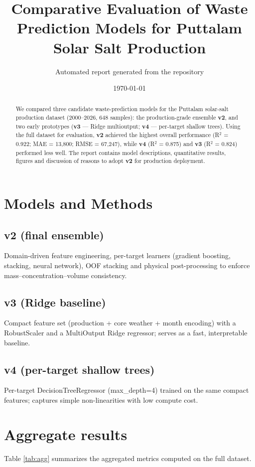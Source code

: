 \documentclass[11pt,a4paper]{article}
\title{Comparative Evaluation of Waste Prediction Models for Puttalam Solar Salt Production}
\author{Automated report generated from the repository}
\date{\today}
\begin{document}
\maketitle

\begin{abstract}
We compared three candidate waste-prediction models for the Puttalam solar-salt production dataset (2000--2026, 648 samples): the production-grade ensemble \textbf{v2}, and two early prototypes (\textbf{v3} — Ridge multioutput; \textbf{v4} — per-target shallow trees). Using the full dataset for evaluation, \textbf{v2} achieved the highest overall performance (R$^2$ = 0.922; MAE = 13,800; RMSE = 67,247), while \textbf{v4} (R$^2$ = 0.875) and \textbf{v3} (R$^2$ = 0.824) performed less well. The report contains model descriptions, quantitative results, figures and discussion of reasons to adopt \textbf{v2} for production deployment.
\end{abstract}

\section{Models and Methods}
\subsection{v2 (final ensemble)}
Domain-driven feature engineering, per-target learners (gradient boosting, stacking, neural network), OOF stacking and physical post-processing to enforce mass--concentration--volume consistency.

\subsection{v3 (Ridge baseline)}
Compact feature set (production + core weather + month encoding) with a RobustScaler and a MultiOutput Ridge regressor; serves as a fast, interpretable baseline.

\subsection{v4 (per-target shallow trees)}
Per-target DecisionTreeRegressor (max\_depth=4) trained on the same compact features; captures simple non-linearities with low compute cost.

\section{Aggregate results}
Table \ref{tab:agg} summarizes the aggregated metrics computed on the full dataset.
\end{document}
